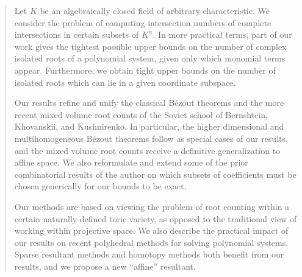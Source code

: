 \begin{abstract}
Let $K$ be an algebraically closed field of arbitrary characteristic. We 
consider the problem of computing intersection numbers of complete 
intersections in certain subsets of $K^n$. In more practical terms, part of 
our work gives the tightest possible upper bounds on the number of complex 
isolated roots of a polynomial system, given only which monomial terms appear. 
Furthermore, we obtain tight upper bounds on the number of isolated roots 
which can lie in a given coordinate subspace. 

Our results refine and unify the classical B\'ezout 
theorems and the more recent mixed volume root counts of the Soviet school of 
Bernshtein, Khovanskii, and Kushnirenko. In particular, the higher dimensional 
and multihomogeneous B\'ezout theorems follow as special cases of our results, 
and the mixed volume root counts receive a definitive generalization to 
affine space. We also reformulate and extend some of the prior combinatorial 
results of the author on which subsets of coefficients must be chosen 
generically for our bounds to be exact. 
 
Our methods are based on viewing the problem of root counting within a certain 
naturally defined toric variety, as opposed to the traditional view of working 
within projective space. We also describe the practical impact of our results 
on recent polyhedral methods for solving polynomial systems. Sparse resultant 
methods and homotopy methods both benefit from our results, and we 
propose a new ``affine'' resultant. 
\end{abstract}


